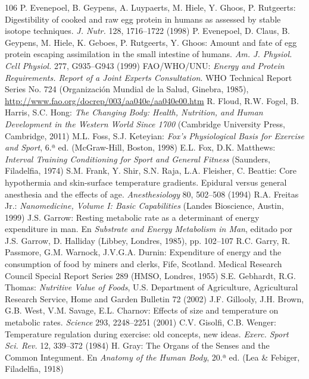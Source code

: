 \documentclass[12pt]{book}
\begin{document}
\begin{thebibliography}{106}
   P. Evenepoel, B. Geypens, A. Luypaerts, M. Hiele, Y. Ghoos, P. Rutgeerts: Digestibility of cooked and raw egg protein in humans as assessed by stable isotope techniques. \textit{J. Nutr.} 128, 1716--1722 (1998)
   P. Evenepoel, D. Claus, B. Geypens, M. Hiele, K. Geboes, P. Rutgeerts, Y. Ghoos: Amount and fate of egg protein escaping assimilation in the small intestine of humans. \textit{Am. J. Physiol. Cell Physiol.} 277, G935--G943 (1999)
   FAO/WHO/UNU: \textit{Energy and Protein Requirements. Report of a Joint Experts Consultation}. WHO Technical Report Series No. 724 (Organización Mundial de la Salud, Ginebra, 1985), \url{http://www.fao.org/docrep/003/aa040e/aa040e00.htm}
   R. Floud, R.W. Fogel, B. Harris, S.C. Hong: \textit{The Changing Body: Health, Nutrition, and Human Development in the Western World Since 1700} (Cambridge University Press, Cambridge, 2011)
   M.L. Foss, S.J. Keteyian: \textit{Fox's Physiological Basis for Exercise and Sport}, 6.ª ed. (McGraw-Hill, Boston, 1998)
   E.L. Fox, D.K. Matthews: \textit{Interval Training Conditioning for Sport and General Fitness} (Saunders, Filadelfia, 1974)
   S.M. Frank, Y. Shir, S.N. Raja, L.A. Fleisher, C. Beattie: Core hypothermia and skin-surface temperature gradients. Epidural versus general anesthesia and the effects of age. \textit{Anesthesiology} 80, 502--508 (1994)
   R.A. Freitas Jr.: \textit{Nanomedicine, Volume I: Basic Capabilities} (Landes Bioscience, Austin, 1999)
   J.S. Garrow: Resting metabolic rate as a determinant of energy expenditure in man. En \textit{Substrate and Energy Metabolism in Man}, editado por J.S. Garrow, D. Halliday (Libbey, Londres, 1985), pp. 102--107
   R.C. Garry, R. Passmore, G.M. Warnock, J.V.G.A. Durnin: Expenditure of energy and the consumption of food by miners and clerks, Fife, Scotland. Medical Research Council Special Report Series 289 (HMSO, Londres, 1955)
   S.E. Gebhardt, R.G. Thomas: \textit{Nutritive Value of Foods}, U.S. Department of Agriculture, Agricultural Research Service, Home and Garden Bulletin 72 (2002)
   J.F. Gillooly, J.H. Brown, G.B. West, V.M. Savage, E.L. Charnov: Effects of size and temperature on metabolic rates. \textit{Science} 293, 2248--2251 (2001)
   C.V. Gisolfi, C.B. Wenger: Temperature regulation during exercise: old concepts, new ideas. \textit{Exerc. Sport Sci. Rev.} 12, 339--372 (1984)
   H. Gray: The Organs of the Senses and the Common Integument. En \textit{Anatomy of the Human Body}, 20.ª ed. (Lea \& Febiger, Filadelfia, 1918)

\end{thebibliography}
\end{document}

